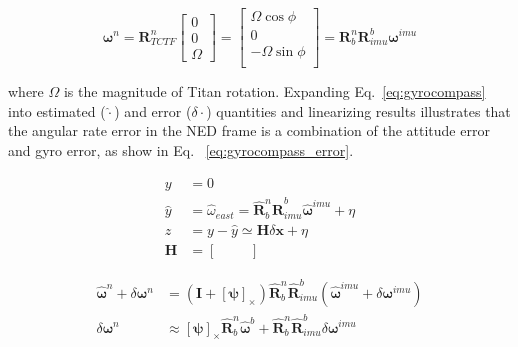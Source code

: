 \begin{equation} \label{eq:gyrocompass}
\bm{\omega}^{n} = \bm{R}_{TCTF}^{n} \begin{bmatrix} 0 \\ 0 \\ \Omega \end{bmatrix} = \begin{bmatrix}
\Omega\cos\phi \\
0 \\
- \Omega\sin\phi \\ 
\end{bmatrix} = \bm{R}_{b}^{n} \bm{R}_{imu}^{b}\bm{\omega}^{imu}
\end{equation}

\noindent where $\Omega$ is the magnitude of Titan rotation. Expanding Eq.~\ref{eq:gyrocompass} into estimated ($\hat{\cdot}$) and error ($\delta{\cdot}$) quantities and linearizing results illustrates that the angular rate error in the \ac{NED} frame is a combination of the attitude error and gyro error, as show in Eq. ~\ref{eq:gyrocompass_error}.

\begin{equation} \label{eq:gyrocompass_model}
\begin{aligned}
y &= 0 \\
\hat{y} &= \hat{\omega}_{east} = \hat{\bm{R}}_{b}^{n}\hat{\bm{R}}_{imu}^{b}\hat{\bm{\omega}}^{imu} + \eta \\
z &= y - \hat{y} \simeq \bm{H}\delta \bm{x} + \eta \\
\bm{H} &= \begin{bmatrix} & & \end{bmatrix}
\end{aligned}
\end{equation}

\begin{equation} \label{eq:gyrocompass_error}
\begin{aligned}
\hat{\bm{\omega}}^{n} + \delta\bm{\omega}^{n}&= \left(\bm{I} + \left[\bm{\psi}\right]_{\times}\right)\hat{\bm{R}}_{b}^{n}\hat{\bm{R}}_{imu}^{b} \left(\hat{\bm{\omega}}^{imu} + \delta \bm{\omega}^{imu}\right) \\
\delta\bm{\omega}^{n} &\approx \left[\bm{\psi}\right]_{\times}\hat{\bm{R}}_{b}^{n}\hat{\bm{\omega}}^{b} + \hat{\bm{R}}_{b}^{n}\hat{\bm{R}}_{imu}^{b}\delta \bm{\omega}^{imu} \\
\end{aligned}
\end{equation}

